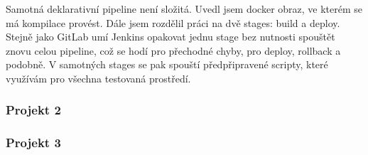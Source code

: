             Samotná deklarativní pipeline není složitá. Uvedl jsem docker obraz, ve kterém se má kompilace provést. Dále jsem rozdělil práci na dvě stages: build a deploy. Stejně jako GitLab umí Jenkins opakovat jednu stage bez nutnosti spouštět znovu celou pipeline, což se hodí pro přechodné chyby, pro deploy, rollback a podobně. V samotných stages se pak spouští předpřipravené scripty, které využívám pro všechna testovaná \CICD prostředí.

        \subsubsection{Projekt 2}
            \blind[2]
        \subsubsection{Projekt 3}
            \blind[2]

